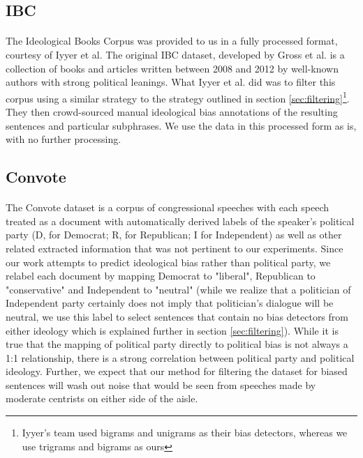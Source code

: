 \documentclass[10pt,a4paper,onecolumn]{article}
\begin{document}
\subsection{IBC}
\paragraph{}
The Ideological Books Corpus was provided to us in a fully processed format, courtesy of Iyyer et al.\cite{iyyerRNN} The original IBC dataset, developed by Gross et al.\cite{gross2013ibc} is a collection of books and articles written between 2008 and 2012 by well-known authors with strong political leanings. What Iyyer et al. did was to filter this corpus using a similar strategy to the strategy outlined in section \ref{sec:filtering}\footnote{Iyyer's team used bigrams and unigrams as their bias detectors, whereas we use trigrams and bigrams as ours}. They then crowd-sourced manual ideological bias annotations of the resulting sentences and particular subphrases. We use the data in this processed form as is, with no further processing.

\subsection{Convote}
\paragraph{}
The Convote dataset is a corpus of congressional speeches with each speech treated as a document with automatically derived labels of the speaker's political party (D, for Democrat; R, for Republican; I for Independent) as well as other related extracted information that was not pertinent to our experiments. Since our work attempts to predict ideological bias rather than political party, we relabel each document by mapping Democrat to "liberal", Republican to "conservative" and Independent to "neutral" (while we realize that a politician of Independent party certainly does not imply that politician's dialogue will be neutral, we use this label to select sentences that contain no bias detectors from either ideology which is explained further in section \ref{sec:filtering}). While it is true that the mapping of political party directly to political bias is not always a 1:1 relationship, there is a strong correlation between political party and political ideology. Further, we expect that our method for filtering the dataset for biased sentences will wash out noise that would be seen from speeches made by moderate centrists on either side of the aisle.
\end{document}
